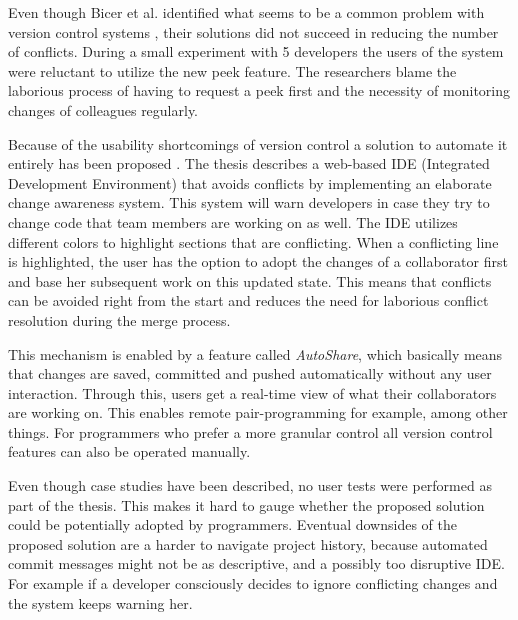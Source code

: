 Even though Bicer et al. identified what seems to be a common problem with version control systems \cite{apel_semistructured_2011} \cite{brosch_guiding_2010} \cite{guimaraes_improving_2012},  their solutions did not succeed in reducing the number of conflicts. During a small experiment with 5 developers the users of the system were reluctant to utilize the new peek feature. The researchers blame the laborious process of having to request a peek first and the necessity of monitoring changes of colleagues regularly. 

\setlength{\parskip}{1em}
\noindent Because of the usability shortcomings of version control a solution to automate it entirely has been proposed \cite{weber_automatic_2012}. The thesis describes a web-based IDE (Integrated Development Environment) that avoids conflicts by implementing an elaborate change awareness system. This system will warn developers in case they try to change code that team members are working on as well. The IDE utilizes different colors to highlight sections that are conflicting. When a conflicting line is highlighted, the user has the option to adopt the changes of a collaborator first and base her subsequent work on this updated state. This means that conflicts can be avoided right from the start and reduces the need for laborious conflict resolution during the merge process. 

\setlength{\parskip}{0em}
This mechanism is enabled by a feature called \textit{AutoShare}, which basically means that changes are saved, committed and pushed automatically without any user interaction. Through this, users get a real-time view of what their collaborators are working on. This enables remote pair-programming for example, among other things. For programmers who prefer a more granular control all version control features can also be operated manually.

Even though case studies have been described, no user tests were performed as part of the thesis. This makes it hard to gauge whether the proposed solution could be potentially adopted by programmers. Eventual downsides of the proposed solution are a harder to navigate project history, because automated commit messages might not be as descriptive, and a possibly too disruptive IDE. For example if a developer consciously decides to ignore conflicting changes and the system keeps warning her.%

